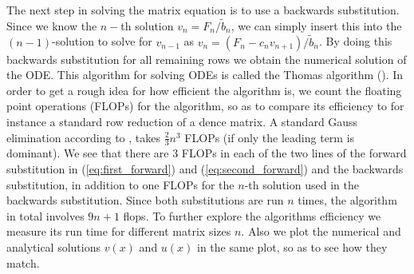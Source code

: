 \documentclass[twocolumn]{aastex62}
\begin{document}
The next step in solving the matrix equation is to use a backwards substitution. Since we know the $n-$th solution $v_n = F_n/\tilde{b}_n$, we can simply insert this into the $(n-1)$-solution to solve for $v_{n-1}$ as $v_{n} = (F_{n} - c_{n}v_{n+1})/ \tilde{b}_{n}$. By doing this backwards substitution for all remaining rows we obtain the numerical solution of the ODE. This algorithm for solving ODEs is called the Thomas algorithm (\cite{Thomas:1949}). In order to get a rough idea for how efficient the algorithm is, we count the floating point operations (FLOPs) for the algorithm, so as to compare its efficiency to for instance a standard row reduction of a dence matrix. A standard Gauss elimination according to \citep{Boyd:2004}, takes $\frac{2}{3}n^3$ FLOPs (if only the leading term is dominant). We see that there are 3 FLOPs in each of the two lines of the forward substitution in (\ref{eq:first_forward}) and (\ref{eq:second_forward}) and the backwards substitution, in addition to one FLOPs for the $n$-th solution used in the backwards substitution. Since both substitutions are run $n$ times, the algorithm in total involves $9n + 1$ flops. To further explore the algorithms efficiency we measure its run time for different matrix sizes $n$. Also we plot the numerical and analytical solutions $v(x)$ and $u(x)$ in the same plot, so as to see how they match. 
\end{document}
